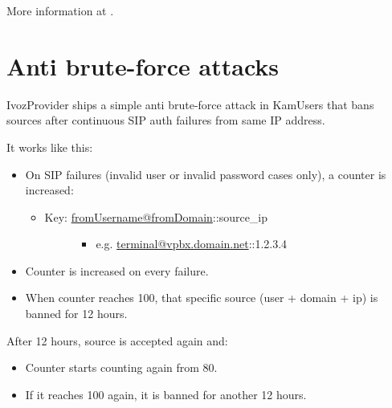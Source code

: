 \documentclass[letterpaper,10pt,spanish]{sphinxmanual}
\begin{document}
More information at {\hyperref[administration_portal/brand/billing/current_day_usages:current\string-day\string-usages]{}}.


\section{Anti brute-force attacks}
\label{security_and_maintenance/security/antibruteforce:anti-brute-force-attacks}\label{security_and_maintenance/security/antibruteforce::doc}\label{security_and_maintenance/security/antibruteforce:id1}
IvozProvider ships a simple anti brute-force attack in KamUsers that bans sources after continuous SIP auth failures
from same IP address.

It works like this:
\begin{itemize}
\item {} 
On SIP failures (invalid user or invalid password cases only), a counter is increased:
\begin{itemize}
\item {} \begin{description}
\item[{Key: \href{mailto:fromUsername@fromDomain}{fromUsername@fromDomain}::source\_ip}] \leavevmode\begin{itemize}
\item {} 
e.g. \href{mailto:terminal@vpbx.domain.net}{terminal@vpbx.domain.net}::1.2.3.4

\end{itemize}

\end{description}

\end{itemize}

\item {} 
Counter is increased on every failure.

\item {} 
When counter reaches 100, that specific source (user + domain + ip) is banned for 12 hours.

\end{itemize}

After 12 hours, source is accepted again and:
\begin{itemize}
\item {} 
Counter starts counting again from 80.

\item {} 
If it reaches 100 again, it is banned for another 12 hours.

\end{itemize}
\end{document}
